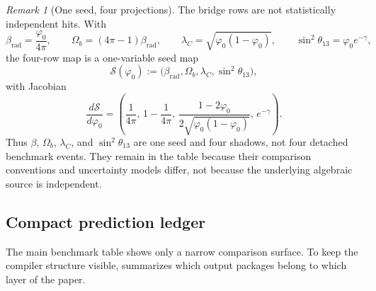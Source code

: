 \documentclass[11pt,a4paper]{article}
\theoremstyle{definition}
\theoremstyle{remark}
\newtheorem*{remark}{Remark}
\newcommand{\phiz}{\varphi_0}
\begin{document}
\begin{remark}[One seed, four projections]
The bridge rows are not statistically independent hits. With
\[
\beta_{\mathrm{rad}}=\frac{\phiz}{4\pi},
\qquad
\Omega_b=(4\pi-1)\beta_{\mathrm{rad}},
\qquad
\lambda_C=\sqrt{\phiz(1-\phiz)},
\qquad
\sin^2\theta_{13}=\phiz e^{-\gamma},
\]
the four-row map is a one-variable seed map
\[
\mathcal S(\phiz):=\bigl(\beta_{\mathrm{rad}},\Omega_b,\lambda_C,\sin^2\theta_{13}\bigr),
\]
with Jacobian
\[
\frac{d\mathcal S}{d\phiz}
=
\left(
\frac{1}{4\pi},
\,
1-\frac{1}{4\pi},
\,
\frac{1-2\phiz}{2\sqrt{\phiz(1-\phiz)}},
\,
e^{-\gamma}
\right).
\]
Thus $\beta$, $\Omega_b$, $\lambda_C$, and $\sin^2\theta_{13}$ are one seed and four shadows, not four detached benchmark events. They remain in the table because their comparison conventions and uncertainty models differ, not because the underlying algebraic source is independent.
\end{remark}

\subsection{Compact prediction ledger}

The main benchmark table shows only a narrow comparison surface. To keep the compiler structure visible,  summarizes which output packages belong to which layer of the paper.
\end{document}
